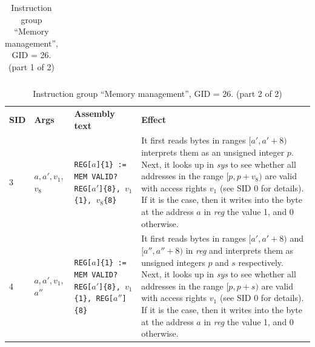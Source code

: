 \documentclass[10pt,twocolumn]{article}
\begin{document}
\begin{table}[!h]
\begin{center}
\begin{tabular}{lp{1.2cm}p{5.5cm}p{7.5cm}}
\end{tabular}
\end{center}
\caption{Instruction group ``Memory management'', GID = 26. (part 1 of 2)}
\label{tab:igroup:memory}
\end{table}

\clearpage

\begin{table}[!h]
\begin{center}
\def\arraystretch{1.5}
\begin{tabular}{lp{1.2cm}p{5.5cm}p{7.5cm}}
\textbf{SID} & \textbf{Args} & \textbf{Assembly text} & \textbf{Effect}
\\

3 & $ a,a',v_1, $  $ v_8 $ %
& \texttt{REG[}$ a $\texttt{]\{1\} := MEM VALID? REG[}$ a' $\texttt{]\{8\}, }$
v_1 $\texttt{\{1\}, }$ v_8 $\texttt{\{8\}} %
& It first reads bytes in ranges $ [a',a'+8) $ interprets them as an unsigned
integer $ p $. Next, it looks up in \textit{sys} to see whether all addresses in
the range $ [p,p+v_8) $ are valid with access rights $ v_1 $ (see SID 0 for
details). If it is the case, then it writes into the byte at the address $ a $
in \textit{reg} the value 1, and 0 otherwise. \\

4 & $ a,a',v_1, $  $ a'' $ %
& \texttt{REG[}$ a $\texttt{]\{1\} := MEM VALID? REG[}$ a' $\texttt{]\{8\}, }$
v_1 $\texttt{\{1\}, REG[}$ a'' $\texttt{]\{8\}} %
& It first reads bytes in ranges $ [a',a'+8) $ and $ [a'',a''+8) $ in
\textit{reg} and interprets them as unsigned integers $ p $ and $ s $
respectively. Next, it looks up in \textit{sys} to see whether all addresses in
the range $ [p,p+s) $ are valid with access rights $ v_1 $ (see SID 0 for
details). If it is the case, then it writes into the byte at the address $ a $
in \textit{reg} the value 1, and 0 otherwise. \\

\end{tabular}
\end{center}
\caption{Instruction group ``Memory management'', GID = 26. (part 2 of 2)}
\end{table}


\end{document}
